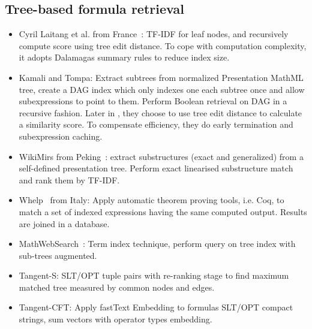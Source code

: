 \documentclass[11pt]{artikel3}
\begin{document}
\subsection{Tree-based formula retrieval}
\begin{itemize}
\item Cyril Laitang et al. from France~\cite{laitang2011xml}: TF-IDF for leaf nodes, and recursively compute score using tree edit distance. To cope with computation complexity, it adopts Dalamagas summary rules to reduce index size.
\item Kamali and Tompa: \cite{kamali2010new} Extract subtrees from normalized Presentation MathML tree, create a DAG index which only indexes one each subtree once and allow subexpressions to point to them. Perform Boolean retrieval on DAG in a recursive fashion. Later in \cite{kamali2013structural}, they choose to use tree edit distance to calculate a similarity score. To compensate efficiency, they do early termination and subexpression caching.
\item WikiMirs from Peking~\cite{hu2013wikimirs}: extract substructures (exact and generalized) from a self-defined presentation tree. Perform exact linearised substructure match and rank them by TF-IDF.
\item Whelp~\cite{asperti2004content} from Italy: Apply automatic theorem proving tools, i.e. Coq, to match a set of indexed expressions having the same computed output. Results are joined in a database.
\item MathWebSearch~\cite{kohlhase2006search,kohlhase2008mathwebsearch,kohlhase2012mathwebsearch}: Term index technique, perform query on tree index with sub-trees augmented.
\item Tangent-S: SLT/OPT tuple pairs with re-ranking stage to find maximum matched tree measured by common nodes and edges.
\item Tangent-CFT: Apply fastText Embedding to formulas SLT/OPT compact strings, sum vectors with operator types embedding.


\end{itemize}
\end{document}
